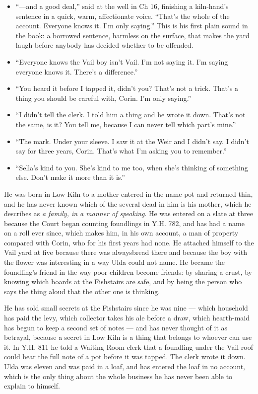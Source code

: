 \documentclass{design/chronicle}
\begin{document}
{\begin{itemize}[leftmargin=1.4em,itemsep=1pt,topsep=3pt,parsep=0pt]
\item “—and a good deal,” said at the well in Ch 16, finishing a kiln-hand’s sentence in a quick, warm, affectionate voice. “That’s the whole of the account. Everyone knows it. I’m only saying.” This is his first plain sound in the book: a borrowed sentence, harmless on the surface, that makes the yard laugh before anybody has decided whether to be offended.

\item “Everyone knows the Vail boy isn’t Vail. I’m not saying it. I’m saying everyone knows it. There’s a difference.”

\item “You heard it before I tapped it, didn’t you? That’s not a trick. That’s a thing you should be careful with, Corin. I’m only saying.”

\item “I didn’t tell the clerk. I told him a thing and he wrote it down. That’s not the same, is it? You tell me, because I can never tell which part’s mine.”

\item “The mark. Under your sleeve. I saw it at the Weir and I didn’t say. I didn’t say for three years, Corin. That’s what I’m asking you to remember.”

\item “Sella’s kind to you. She’s kind to me too, when she’s thinking of something else. Don’t make it more than it is.”

\end{itemize}

He was born in Low Kiln to a mother entered in the name-pot and returned thin, and he has never known which of the several dead in him is his mother, which he describes as \emph{a family, in a manner of speaking}. He was entered on a slate at three because the Court began counting foundlings in Y.H. 782, and has had a name on a roll ever since, which makes him, in his own account, a man of property compared with Corin, who for his first years had none. He attached himself to the Vail yard at five because there was alwaysbread there and because the boy with the flower was interesting in a way Ulda could not name. He became the foundling’s friend in the way poor children become friends: by sharing a crust, by knowing which boards at the Fishstairs are safe, and by being the person who says the thing aloud that the other one is thinking.

He has sold small secrets at the Fishstairs since he was nine — which household has paid the levy, which collector takes his ale before a draw, which hearth-maid has begun to keep a second set of notes — and has never thought of it as betrayal, because a secret in Low Kiln is a thing that belongs to whoever can use it. In Y.H. 811 he told a Waiting Room clerk that a foundling under the Vail roof could hear the full note of a pot before it was tapped. The clerk wrote it down. Ulda was eleven and was paid in a loaf, and has entered the loaf in no account, which is the only thing about the whole business he has never been able to explain to himself.

}
\end{document}
